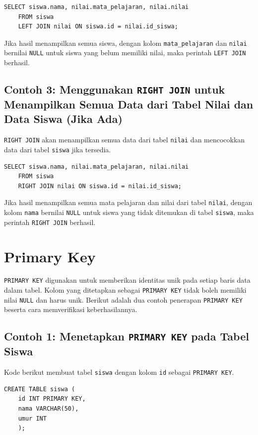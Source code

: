 \begin{lstlisting}[style=sql]
	SELECT siswa.nama, nilai.mata_pelajaran, nilai.nilai
	FROM siswa
	LEFT JOIN nilai ON siswa.id = nilai.id_siswa;
\end{lstlisting}

Jika hasil menampilkan semua siswa, dengan kolom \texttt{mata\_pelajaran} dan \texttt{nilai} bernilai \texttt{NULL} untuk siswa yang belum memiliki nilai, maka perintah \texttt{LEFT JOIN} berhasil.

\subsection*{Contoh 3: Menggunakan \texttt{RIGHT JOIN} untuk Menampilkan Semua Data dari Tabel Nilai dan Data Siswa (Jika Ada)}
\texttt{RIGHT JOIN} akan menampilkan semua data dari tabel \texttt{nilai} dan mencocokkan data dari tabel \texttt{siswa} jika tersedia.

\begin{lstlisting}[style=sql]
	SELECT siswa.nama, nilai.mata_pelajaran, nilai.nilai
	FROM siswa
	RIGHT JOIN nilai ON siswa.id = nilai.id_siswa;
\end{lstlisting}

Jika hasil menampilkan semua mata pelajaran dan nilai dari tabel \texttt{nilai}, dengan kolom \texttt{nama} bernilai \texttt{NULL} untuk siswa yang tidak ditemukan di tabel \texttt{siswa}, maka perintah \texttt{RIGHT JOIN} berhasil.

\section{Primary Key}

\texttt{PRIMARY KEY} digunakan untuk memberikan identitas unik pada setiap baris data dalam tabel. Kolom yang ditetapkan sebagai \texttt{PRIMARY KEY} tidak boleh memiliki nilai \texttt{NULL} dan harus unik. Berikut adalah dua contoh penerapan \texttt{PRIMARY KEY} beserta cara memverifikasi keberhasilannya.

\subsection*{Contoh 1: Menetapkan \texttt{PRIMARY KEY} pada Tabel Siswa}
Kode berikut membuat tabel \texttt{siswa} dengan kolom \texttt{id} sebagai \texttt{PRIMARY KEY}.

\begin{lstlisting}[style=sql]
	CREATE TABLE siswa (
	id INT PRIMARY KEY,
	nama VARCHAR(50),
	umur INT
	);
\end{lstlisting}

